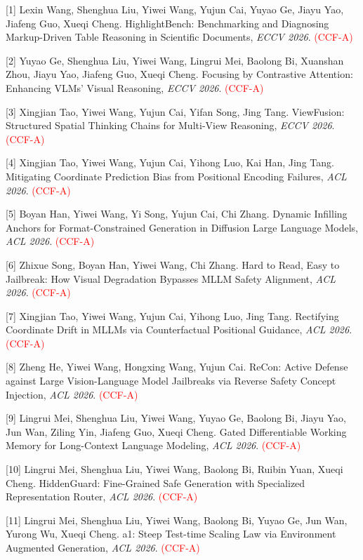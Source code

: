 [1] Lexin Wang, Shenghua Liu, Yiwei Wang, Yujun Cai, Yuyao Ge, Jiayu Yao, Jiafeng Guo, Xueqi Cheng. {HighlightBench}: Benchmarking and Diagnosing Markup-Driven Table Reasoning in Scientific Documents, \textit{ECCV 2026}. \textcolor{red}{(CCF-A)}

[2] Yuyao Ge, Shenghua Liu, Yiwei Wang, Lingrui Mei, Baolong Bi, Xuanshan Zhou, Jiayu Yao, Jiafeng Guo, Xueqi Cheng. Focusing by Contrastive Attention: Enhancing {VLMs}' Visual Reasoning, \textit{ECCV 2026}. \textcolor{red}{(CCF-A)}

[3] Xingjian Tao, Yiwei Wang, Yujun Cai, Yifan Song, Jing Tang. {ViewFusion}: Structured Spatial Thinking Chains for Multi-View Reasoning, \textit{ECCV 2026}. \textcolor{red}{(CCF-A)}

[4] Xingjian Tao, Yiwei Wang, Yujun Cai, Yihong Luo, Kai Han, Jing Tang. Mitigating Coordinate Prediction Bias from Positional Encoding Failures, \textit{ACL 2026}. \textcolor{red}{(CCF-A)}

[5] Boyan Han, Yiwei Wang, Yi Song, Yujun Cai, Chi Zhang. Dynamic Infilling Anchors for Format-Constrained Generation in Diffusion Large Language Models, \textit{ACL 2026}. \textcolor{red}{(CCF-A)}

[6] Zhixue Song, Boyan Han, Yiwei Wang, Chi Zhang. Hard to Read, Easy to Jailbreak: How Visual Degradation Bypasses MLLM Safety Alignment, \textit{ACL 2026}. \textcolor{red}{(CCF-A)}

[7] Xingjian Tao, Yiwei Wang, Yujun Cai, Yihong Luo, Jing Tang. Rectifying Coordinate Drift in MLLMs via Counterfactual Positional Guidance, \textit{ACL 2026}. \textcolor{red}{(CCF-A)}

[8] Zheng He, Yiwei Wang, Hongxing Wang, Yujun Cai. ReCon: Active Defense against Large Vision-Language Model Jailbreaks via Reverse Safety Concept Injection, \textit{ACL 2026}. \textcolor{red}{(CCF-A)}

[9] Lingrui Mei, Shenghua Liu, Yiwei Wang, Yuyao Ge, Baolong Bi, Jiayu Yao, Jun Wan, Ziling Yin, Jiafeng Guo, Xueqi Cheng. Gated Differentiable Working Memory for Long-Context Language Modeling, \textit{ACL 2026}. \textcolor{red}{(CCF-A)}

[10] Lingrui Mei, Shenghua Liu, Yiwei Wang, Baolong Bi, Ruibin Yuan, Xueqi Cheng. HiddenGuard: Fine-Grained Safe Generation with Specialized Representation Router, \textit{ACL 2026}. \textcolor{red}{(CCF-A)}

[11] Lingrui Mei, Shenghua Liu, Yiwei Wang, Baolong Bi, Yuyao Ge, Jun Wan, Yurong Wu, Xueqi Cheng. a1: Steep Test-time Scaling Law via Environment Augmented Generation, \textit{ACL 2026}. \textcolor{red}{(CCF-A)}

